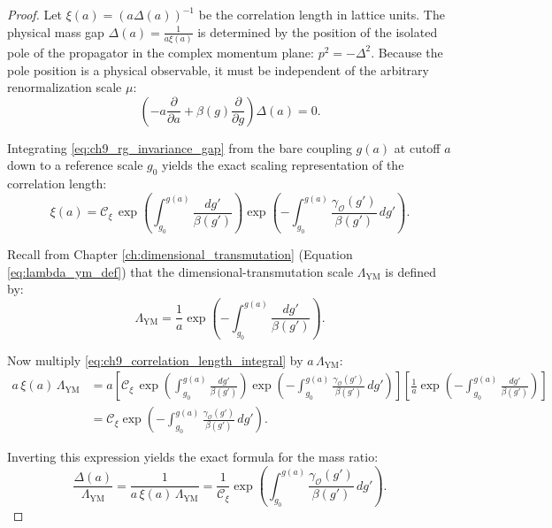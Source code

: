 \begin{proof}
Let $\xi(a) = (a \Delta(a))^{-1}$ be the correlation length in lattice units. The physical mass gap $\Delta(a) = \frac{1}{a \xi(a)}$ is determined by the position of the isolated pole of the propagator in the complex momentum plane: $p^2 = -\Delta^2$. Because the pole position is a physical observable, it must be independent of the arbitrary renormalization scale $\mu$:
\begin{equation}
\label{eq:ch9_rg_invariance_gap}
\left( -a \frac{\partial}{\partial a} + \beta(g) \frac{\partial}{\partial g} \right) \Delta(a) = 0.
\end{equation}

Integrating \eqref{eq:ch9_rg_invariance_gap} from the bare coupling $g(a)$ at cutoff $a$ down to a reference scale $g_0$ yields the exact scaling representation of the correlation length:
\begin{equation}
\label{eq:ch9_correlation_length_integral}
\xi(a) = \mathcal{C}_{\xi} \, \exp\left( \int_{g_0}^{g(a)} \frac{dg'}{\beta(g')} \right) \exp\left( -\int_{g_0}^{g(a)} \frac{\gamma_{\mathcal{O}}(g')}{\beta(g')} \, dg' \right).
\end{equation}

Recall from Chapter \ref{ch:dimensional_transmutation} (Equation \eqref{eq:lambda_ym_def}) that the dimensional-transmutation scale $\Lambda_{\mathrm{YM}}$ is defined by:
\begin{equation}
\label{eq:ch9_lambda_ym_recall}
\Lambda_{\mathrm{YM}} = \frac{1}{a} \exp\left( -\int_{g_0}^{g(a)} \frac{dg'}{\beta(g')} \right).
\end{equation}

Now multiply \eqref{eq:ch9_correlation_length_integral} by $a \, \Lambda_{\mathrm{YM}}$:
\begin{align}
a \, \xi(a) \, \Lambda_{\mathrm{YM}} &= a \left[ \mathcal{C}_{\xi} \, \exp\left( \int_{g_0}^{g(a)} \frac{dg'}{\beta(g')} \right) \exp\left( -\int_{g_0}^{g(a)} \frac{\gamma_{\mathcal{O}}(g')}{\beta(g')} \, dg' \right) \right] \left[ \frac{1}{a} \exp\left( -\int_{g_0}^{g(a)} \frac{dg'}{\beta(g')} \right) \right] \nonumber \\
&= \mathcal{C}_{\xi} \exp\left( -\int_{g_0}^{g(a)} \frac{\gamma_{\mathcal{O}}(g')}{\beta(g')} \, dg' \right).
\end{align}

Inverting this expression yields the exact formula for the mass ratio:
\begin{equation}
\label{eq:ch9_ratio_exact_exponential}
\frac{\Delta(a)}{\Lambda_{\mathrm{YM}}} = \frac{1}{a \, \xi(a) \, \Lambda_{\mathrm{YM}}} = \frac{1}{\mathcal{C}_{\xi}} \exp\left( \int_{g_0}^{g(a)} \frac{\gamma_{\mathcal{O}}(g')}{\beta(g')} \, dg' \right).
\end{equation}


\end{proof}
